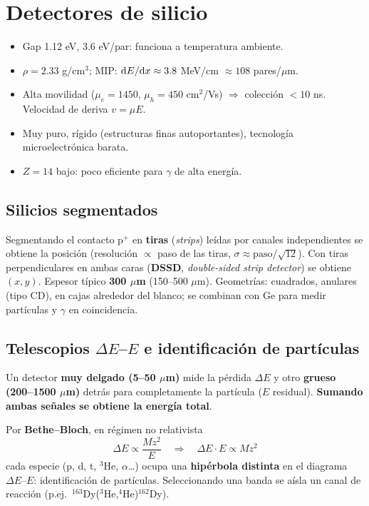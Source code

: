 \section{Detectores de silicio}
\begin{clave}
\begin{itemize}
\item Gap 1.12 eV, 3.6 eV/par: funciona a temperatura ambiente.
\item $\rho=2.33$ g/cm$^3$; MIP: $\mathrm{d}E/\mathrm{d}x\approx3.8$ MeV/cm $\approx108$ pares/$\mu$m.
\item Alta movilidad ($\mu_e=1450$, $\mu_h=450$ cm$^2$/Vs) $\Rightarrow$ colección $<10$ ns. Velocidad de deriva $v=\mu E$.
\item Muy puro, rígido (estructuras finas autoportantes), tecnología microelectrónica barata.
\item $Z=14$ bajo: poco eficiente para $\gamma$ de alta energía.
\end{itemize}
\end{clave}

\subsection{Silicios segmentados}
Segmentando el contacto p$^+$ en \textbf{tiras} (\emph{strips}) leídas por canales independientes se obtiene la posición
(resolución $\propto$ paso de las tiras, $\sigma\approx\text{paso}/\sqrt{12}$). Con tiras perpendiculares en ambas caras
(\textbf{DSSD}, \emph{double-sided strip detector}) se obtiene $(x,y)$. Espesor típico \textbf{300 $\mu$m} (150--500 $\mu$m).
Geometrías: cuadrados, anulares (tipo CD), en cajas alrededor del blanco; se combinan con Ge para medir partículas y $\gamma$ en coincidencia.

\subsection{Telescopios $\Delta E$--$E$ e identificación de partículas}
\begin{clave}
Un detector \textbf{muy delgado (5--50 $\mu$m)} mide la pérdida $\Delta E$ y otro \textbf{grueso (200--1500 $\mu$m)} detrás
para completamente la partícula ($E$ residual). \textbf{Sumando ambas señales se obtiene la energía total}.

Por \textbf{Bethe--Bloch}, en régimen no relativista
\[ \Delta E\propto\frac{Mz^2}{E}\quad\Rightarrow\quad \Delta E\cdot E\propto Mz^2 \]
cada especie (p, d, t, $^3$He, $\alpha$\dots) ocupa una \textbf{hipérbola distinta} en el diagrama $\Delta E$--$E$:
identificación de partículas. Seleccionando una banda se aísla un canal de reacción (p.ej.\ $^{163}$Dy($^3$He,$^4$He)$^{162}$Dy).
\end{clave}


